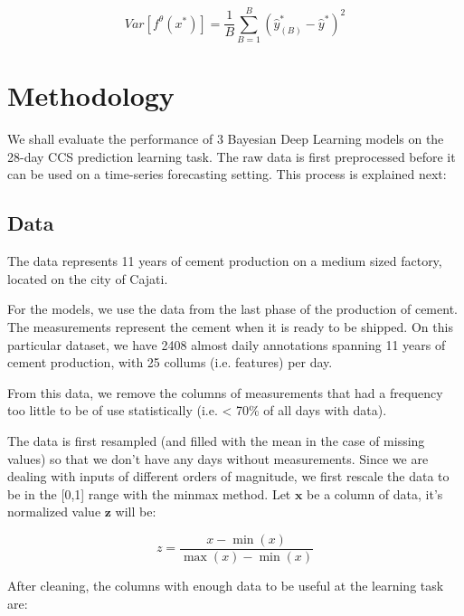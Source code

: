 \documentclass[11pt]{article}
\begin{document}
\begin{equation}
Var[f^{\theta}(x^*)]  = \frac{1}{B}\sum^B_{B=1}(\hat{y}^*_{(B)} - \hat{y}^*)^2  
\end{equation}

\section{Methodology}
\label{sec:org200e1a2}

We shall evaluate the performance of 3 Bayesian Deep Learning models on the 28-day CCS prediction learning task. The raw data is first preprocessed 
before it can be used on a time-series forecasting setting. This process is explained next:

\subsection{Data}
\label{sec:orga54dd7f}

The data represents 11 years of cement production on a medium sized factory, located on the city of Cajati.  

For the models, we use the data from the last phase of the production of cement. The measurements represent the cement when it is ready to be shipped. 
On this particular dataset, we have 2408 almost daily annotations spanning 11 years of cement production, with 25 collums (i.e. features) per day.

From this data, we remove the columns of measurements that had a frequency too little to be of use statistically (i.e. < 70\% of all days with data).

The data is first resampled (and filled with the mean in the case of missing values) so that we don't have any days without measurements. 
Since we are dealing with inputs of different orders of magnitude, we first rescale the data to be in the [0,1] range with the minmax method. Let  \(\textbf{x}\) be a column of data, it's 
normalized value \(\textbf{z}\) will be:


\begin{equation}
z=\frac{x-\min (x)}{\max (x)-\min (x)}
\end{equation}

After cleaning, the columns with enough data to be useful at the learning task are: 
\end{document}

